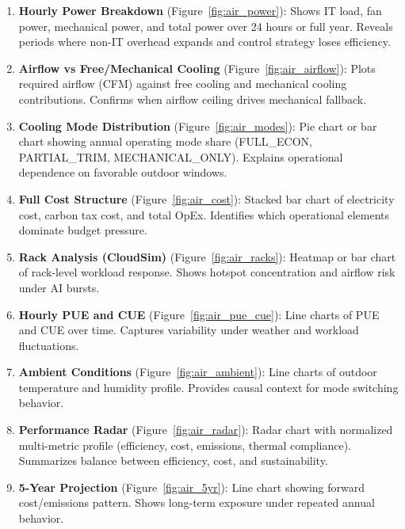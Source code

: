 \documentclass[12pt,a4paper]{report}
\begin{document}
\begin{enumerate}[noitemsep]
  \item \textbf{Hourly Power Breakdown} (Figure~\ref{fig:air_power}): Shows IT load, fan power, mechanical power, and total power over 24 hours or full year. Reveals periods where non-IT overhead expands and control strategy loses efficiency.
  
  \item \textbf{Airflow vs Free/Mechanical Cooling} (Figure~\ref{fig:air_airflow}): Plots required airflow (CFM) against free cooling and mechanical cooling contributions. Confirms when airflow ceiling drives mechanical fallback.
  
  \item \textbf{Cooling Mode Distribution} (Figure~\ref{fig:air_modes}): Pie chart or bar chart showing annual operating mode share (FULL\_ECON, PARTIAL\_TRIM, MECHANICAL\_ONLY). Explains operational dependence on favorable outdoor windows.
  
  \item \textbf{Full Cost Structure} (Figure~\ref{fig:air_cost}): Stacked bar chart of electricity cost, carbon tax cost, and total OpEx. Identifies which operational elements dominate budget pressure.
  
  \item \textbf{Rack Analysis (CloudSim)} (Figure~\ref{fig:air_racks}): Heatmap or bar chart of rack-level workload response. Shows hotspot concentration and airflow risk under AI bursts.
  
  \item \textbf{Hourly PUE and CUE} (Figure~\ref{fig:air_pue_cue}): Line charts of PUE and CUE over time. Captures variability under weather and workload fluctuations.
  
  \item \textbf{Ambient Conditions} (Figure~\ref{fig:air_ambient}): Line charts of outdoor temperature and humidity profile. Provides causal context for mode switching behavior.
  
  \item \textbf{Performance Radar} (Figure~\ref{fig:air_radar}): Radar chart with normalized multi-metric profile (efficiency, cost, emissions, thermal compliance). Summarizes balance between efficiency, cost, and sustainability.
  
  \item \textbf{5-Year Projection} (Figure~\ref{fig:air_5yr}): Line chart showing forward cost/emissions pattern. Shows long-term exposure under repeated annual behavior.
\end{enumerate}
\end{document}
